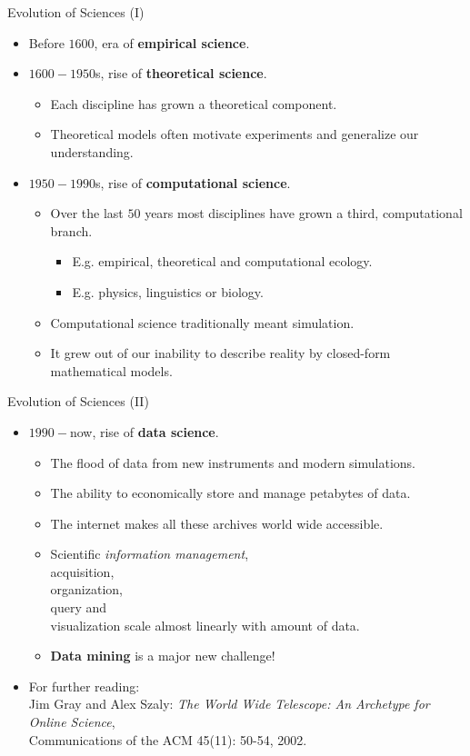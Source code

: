 \begin{frame}{Evolution of Sciences (I)}
	\begin{itemize}
		\item Before $1600$, era of \textbf{empirical science}.
		\item $1600-1950$s, rise of \textbf{theoretical science}.
		\begin{itemize}
			\item Each discipline has grown a theoretical component.
			\item Theoretical models often motivate experiments and generalize 
			our understanding.
		\end{itemize}
		\item $1950-1990$s, rise of \textbf{computational science}.
		\begin{itemize}
			\item Over the last $50$ years most disciplines have grown a third, 
			computational branch.
			\begin{itemize}
				\item E.g. empirical, theoretical and computational ecology.
				\item E.g. physics, linguistics or biology.
			\end{itemize}
			\item Computational science traditionally meant simulation.
			\item It grew out of our inability to describe reality by 
			closed-form mathematical models.
		\end{itemize}
	\end{itemize}
\end{frame}

\begin{frame}{Evolution of Sciences (II)}
	\begin{itemize}
		\item $1990-$now, rise of \textbf{data science}.
		\begin{itemize}
			\item The flood of data from new instruments and modern simulations.
			\item The ability to economically store and manage petabytes of 
			data.
			\item The internet makes all these archives world wide accessible.
			\item Scientific \emph{information management}, \\
			acquisition,\\
			organization, \\
			query and \\
			visualization scale almost linearly with amount of data.
			\item \textbf{Data mining} is a major new challenge!
		\end{itemize}
		\item For further reading:\\
		\small{Jim Gray and Alex Szaly: \emph{The World Wide Telescope: An 
				Archetype for Online Science}, \\ Communications of the ACM 
				45(11): 
			50-54, 2002.}
	\end{itemize}
\end{frame}

